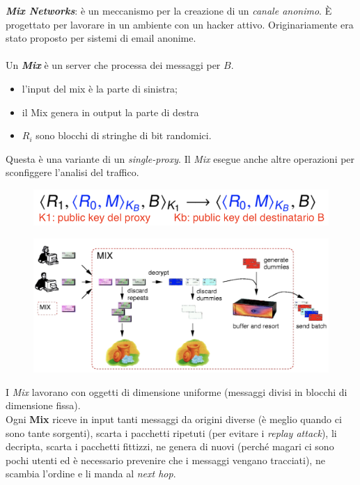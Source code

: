 \documentclass[11pt, a4paper, twoside, italian]{report}
\theoremstyle{plain}
\begin{document}
\begin{multicols}{2}
\noindent
\textit{\textbf{Mix Networks}}: è un meccanismo per la creazione di un \textit{canale anonimo}. È progettato per lavorare in un ambiente con un hacker attivo. Originariamente era stato proposto per sistemi di email anonime.\\\\
Un \textit{\textbf{Mix}} è un server che processa dei messaggi per $B$.\\
\begin{itemize}
	\item l'input del mix è la parte di sinistra;
	\item il Mix genera in output la parte di destra
	\item $R_i$ sono blocchi di stringhe di bit randomici.
\end{itemize}
\noindent
Questa è una variante di un \textit{single-proxy}. Il \textit{Mix} esegue anche altre operazioni per sconfiggere l'analisi del traffico.
\columnbreak
\begin{figure}[H]
	\centering
	\includegraphics[scale=0.55]{mix}
\end{figure}
\begin{figure}[H]
	\centering
	\includegraphics[scale=0.45]{mix2}
\end{figure}
\end{multicols}
\noindent
I \textit{Mix} lavorano con oggetti di dimensione uniforme (messaggi divisi in blocchi di dimensione fissa).\\
Ogni \textbf{Mix} riceve in input tanti messaggi da origini diverse (è meglio quando ci sono tante sorgenti), scarta i pacchetti ripetuti (per evitare i \textit{replay attack}), li decripta, scarta i pacchetti fittizzi, ne genera di nuovi (perché magari ci sono pochi utenti ed è necessario prevenire che i messaggi vengano tracciati), ne scambia l'ordine e li manda al \textit{next hop}.\\
\end{document}

